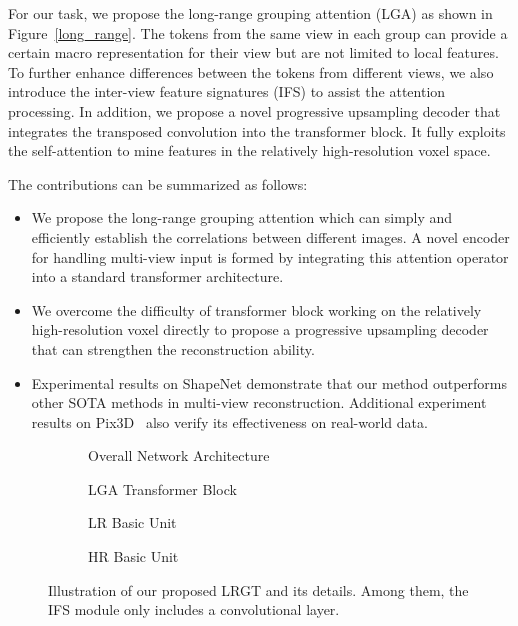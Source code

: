 \documentclass[10pt,twocolumn,letterpaper]{article}
\newcommand{\rulesep}{\unskip\hfill{\color{gray}\vrule}\hfill\ignorespaces}
\begin{document}
For our task, we propose the long-range grouping attention (LGA) as shown in Figure~\ref{long_range}. The tokens from the same view in each group can provide a certain macro representation for their view but are not limited to local features. To further enhance differences between the tokens from different views, we also introduce the inter-view feature signatures (IFS) to assist the attention processing. In addition, we propose a novel progressive upsampling decoder that integrates the transposed convolution into the transformer block. It fully exploits the self-attention to mine features in the relatively high-resolution voxel space.

The contributions can be summarized as follows:
\begin{itemize}
\item{We propose the long-range grouping attention which can simply and efficiently establish the correlations between different images. A novel encoder for handling multi-view input is formed by integrating this attention operator into a standard transformer architecture.}
\item{We overcome the difficulty of transformer block working on the relatively high-resolution voxel directly to propose a progressive upsampling decoder that can strengthen the reconstruction ability.}
\item{Experimental results on ShapeNet \cite{chang2015shapenet} demonstrate that our method outperforms other SOTA methods in multi-view reconstruction. Additional experiment results on Pix3D~\cite{sun2018pix3d} also verify its effectiveness on real-world data.}
\end{itemize}

\begin{figure*}
  \centering
  \begin{subfigure}{.95\linewidth}
    \caption{Overall Network Architecture}
    \label{overall}
  \end{subfigure} \vskip 1mm
  \begin{subfigure}{0.345\linewidth}
    \caption{LGA Transformer Block}
    \label{lga_trans_block}
  \end{subfigure}
\rulesep
  \begin{subfigure}{0.19\linewidth}
    \caption{LR Basic Unit}
    \label{lr_basic_unit}
  \end{subfigure}
\rulesep
  \begin{subfigure}{0.35\linewidth}
    \caption{HR Basic Unit}
    \label{hr_basic_unit}
  \end{subfigure}
  \caption{Illustration of our proposed LRGT and its details. Among them, the IFS module only includes a convolutional layer.}
  \label{highlight}
\end{figure*}
\end{document}
